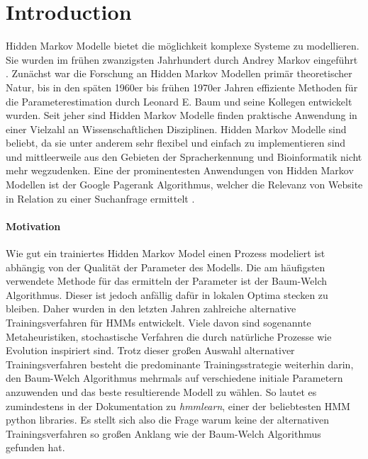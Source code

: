 \chapter{Introduction}
Hidden Markov Modelle bietet die möglichkeit komplexe Systeme zu modellieren. Sie wurden im frühen zwanzigsten Jahrhundert durch Andrey Markov eingeführt \cite*{rabiner}. Zunächst war die Forschung an Hidden Markov Modellen primär theoretischer Natur, bis in den späten 1960er bis frühen 1970er Jahren effiziente Methoden für die Parameterestimation durch Leonard E. Baum und seine Kollegen entwickelt wurden. Seit jeher sind Hidden Markov Modelle finden praktische Anwendung in einer Vielzahl an Wissenschaftlichen Disziplinen. Hidden Markov Modelle sind beliebt, da sie unter anderem sehr flexibel und einfach zu implementieren sind \cite*{HmmReview} und mittleerweile aus den Gebieten der Spracherkennung \cite*{ApplicationSpeechRecognition} und Bioinformatik \cite*{ApplicationComputationalBiology} nicht mehr wegzudenken. Eine der prominentesten Anwendungen von Hidden Markov Modellen ist der Google Pagerank Algorithmus, welcher die Relevanz von Website in Relation zu einer Suchanfrage ermittelt \cite*{ApplicationPageRank}.

\subsubsection*{Motivation}
Wie gut ein trainiertes Hidden Markov Model einen Prozess modeliert ist abhängig von der Qualität der Parameter des Modells. Die am häufigsten verwendete Methode für das ermitteln der Parameter ist der Baum-Welch Algorithmus. Dieser ist jedoch anfällig dafür in lokalen Optima stecken zu bleiben. Daher wurden in den letzten Jahren zahlreiche alternative Trainingsverfahren für HMMs entwickelt. Viele davon sind sogenannte Metaheuristiken, stochastische Verfahren die durch natürliche Prozesse wie Evolution inspiriert sind. Trotz dieser großen Auswahl alternativer Trainingsverfahren besteht die predominante Trainingsstrategie weiterhin darin, den Baum-Welch Algorithmus mehrmals auf verschiedene initiale Parametern anzuwenden und das beste resultierende Modell zu wählen. So lautet es zumindestens in der Dokumentation zu \textit{hmmlearn}, einer der beliebtesten HMM python libraries. Es stellt sich also die Frage warum keine der alternativen Trainingsverfahren so großen Anklang wie der Baum-Welch Algorithmus gefunden hat.

